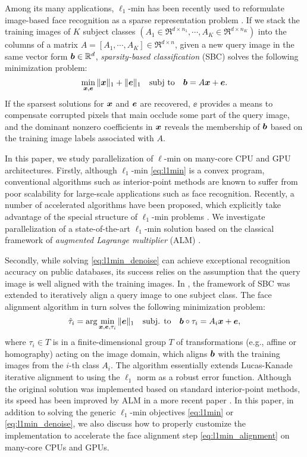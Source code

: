 \documentclass[10pt,twocolumn,letterpaper]{article}
\begin{document}
Among its many applications, $\ell_1$-min has been recently used to reformulate image-based face recognition as a sparse representation problem \cite{WrightJ2009-PAMI}.
If we stack the training images of $K$ subject classes $(A_1\in\Re^{d\times n_1}, \cdots, A_K\in\Re^{d\times n_K})$ into the columns of a matrix $A = [A_1, \cdots, A_K]\in\Re^{d\times n}$, given a new query image in the same vector form ${\boldsymbol{b}}\in{\mathbb{R}}^d$, \emph{sparsity-based classification} (SBC) solves the following minimization problem:
\begin{equation}
\min_{{\boldsymbol{x}}, {\boldsymbol{e}}} \| {\boldsymbol{x}} \|_1 + \|{\boldsymbol{e}}\|_1 \quad \textup{subj to} \quad {\boldsymbol{b}} = A {\boldsymbol{x}} + {\boldsymbol{e}}.
\label{eq:l1min_denoise}
\end{equation}
If the sparsest solutions for ${\boldsymbol{x}}$ and $\boldsymbol{e}$ are recovered, $\ee$ provides a means to compensate corrupted pixels that main occlude some part of the query image, and the dominant nonzero coefficients in ${\boldsymbol{x}}$ reveals the membership of ${\boldsymbol{b}}$ based on the training image labels associated with $A$.

In this paper, we study parallelization of $\ell$-min on many-core CPU and GPU architectures. Firstly, although $\ell_1$-min \eqref{eq:l1min} is a convex program, conventional algorithms such as interior-point methods \cite{ChenS2001-SIAM,TibshiraniR1996} are known to suffer from poor scalability for large-scale applications such as face recognition. Recently, a number of accelerated algorithms have been proposed, which explicitly take advantage of the special structure of $\ell_1$-min problems \cite{LorisI2009,YangA2010-ICIP}. We investigate parallelization of a state-of-the-art $\ell_1$-min solution based on the classical framework of \emph{augmented Lagrange multiplier} (ALM) \cite{BertsekasD2003,YangA2010-ICIP}.

Secondly, while solving \eqref{eq:l1min_denoise} can achieve exceptional recognition accuracy on public databases, its success relies on the assumption that the query image is well aligned with the training images. In \cite{WagnerA2009-CVPR}, the framework of SBC was extended to iteratively align a query image to one subject class. The face alignment algorithm in turn solves the following minimization problem:
\begin{equation}
\hat{\tau}_i = \arg\min_{{\boldsymbol{x}}, {\boldsymbol{e}}, \tau_i} \|{\boldsymbol{e}}\|_1\quad \mbox{subj. to}\quad {\boldsymbol{b}}\circ\tau_i = A_i{\boldsymbol{x}} + {\boldsymbol{e}},
\label{eq:l1min_alignment}
\end{equation}
where $\tau_i\in T$ is in a finite-dimensional group $T$ of transformations (e.g., affine or homography) acting on the image domain, which aligns ${\boldsymbol{b}}$ with the training images from the $i$-th class $A_i$. The algorithm essentially extends Lucas-Kanade iterative alignment \cite{LucasB1981} to using the $\ell_1$ norm as a robust error function.
Although the original solution \cite{WagnerA2009-CVPR} was implemented based on standard interior-point methods, its speed has been improved by ALM in a more recent paper \cite{WagnerA2011-PAMI}. In this paper, in addition to solving the generic $\ell_1$-min objectives \eqref{eq:l1min} or \eqref{eq:l1min_denoise}, we also discuss how to properly customize the implementation to accelerate the face alignment step \eqref{eq:l1min_alignment} on many-core CPUs and GPUs.
\end{document}
